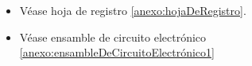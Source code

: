     \begin{itemize}
        \item Véase hoja de registro \ref{anexo:hojaDeRegistro}.
        \item Véase ensamble de circuito electrónico \ref{anexo:ensambleDeCircuitoElectrónico1}
    \end{itemize}
    
    
    
    
    
    
